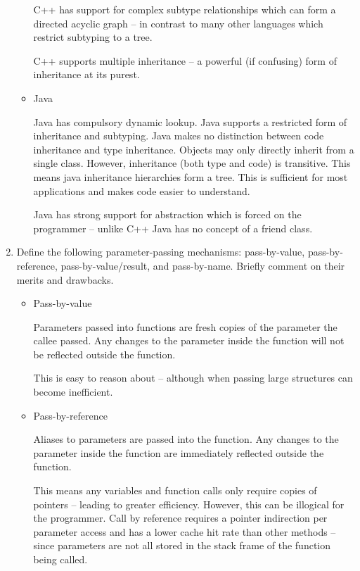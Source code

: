 \documentclass[10pt,\jkfside,a4paper]{article}
\begin{document}
\begin{enumerate}
\begin{itemize}
C++ has support for complex subtype relationships which can form a directed
acyclic graph -- in contrast to many other languages which restrict
subtyping to a tree.

C++ supports multiple inheritance -- a powerful (if confusing) form of
inheritance at its purest.

\item Java

Java has compulsory dynamic lookup. Java supports a restricted form of
inheritance and subtyping. Java makes no distinction between code
inheritance and type inheritance. Objects may only directly inherit from a
single class. However, inheritance (both type and code) is transitive. This
means java inheritance hierarchies form a tree. This is sufficient for
most applications and makes code easier to understand.

Java has strong support for abstraction which is forced on the programmer --
unlike C++ Java has no concept of a friend class.

\end{itemize}

\item Define the following parameter-passing mechanisms: pass-by-value,
pass-by-reference, pass-by-value/result, and pass-by-name. Briefly comment
on their merits and drawbacks.

\begin{itemize}

\item Pass-by-value

Parameters passed into functions are fresh copies of the parameter the
callee passed. Any changes to the parameter inside the function will not be
reflected outside the function.

This is easy to reason about -- although when passing large structures can
become inefficient.

\item Pass-by-reference

Aliases to parameters are passed into the function. Any changes to the
parameter inside the function are immediately reflected outside the function.

This means any variables and function calls only require copies of pointers
-- leading to greater efficiency. However, this can be illogical for the
programmer. Call by reference requires a pointer indirection per parameter
access and has a lower cache hit rate than other methods -- since
parameters are not all stored in the stack frame of the function being called.


\end{itemize}
\end{enumerate}
\end{document}

